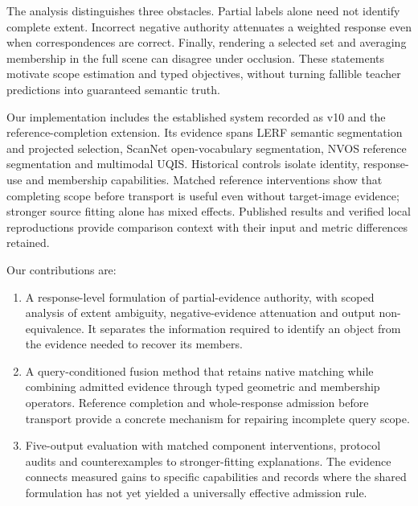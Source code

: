 The analysis distinguishes three obstacles. Partial labels alone need not
identify complete extent. Incorrect negative authority attenuates a weighted
response even when correspondences are correct. Finally, rendering a selected
set and averaging membership in the full scene can disagree under occlusion.
These statements motivate scope estimation and typed objectives, without
turning fallible teacher predictions into guaranteed semantic truth.

Our implementation includes the established system recorded as v10 and the
reference-completion extension. Its evidence spans LERF semantic segmentation
and projected selection, ScanNet open-vocabulary segmentation, NVOS reference
segmentation and multimodal UQIS. Historical controls isolate identity,
response-use and membership capabilities. Matched reference interventions show
that completing scope before transport is useful even without target-image
evidence; stronger source fitting alone has mixed effects. Published results
and verified local reproductions provide comparison context with their input
and metric differences retained.

Our contributions are:
\begin{enumerate}
\item A response-level formulation of partial-evidence authority, with scoped
analysis of extent ambiguity, negative-evidence attenuation and output
non-equivalence. It separates the information required to identify an object
from the evidence needed to recover its members.
\item A query-conditioned fusion method that retains native matching while
combining admitted evidence through typed geometric and membership operators.
Reference completion and whole-response admission before transport provide a
concrete mechanism for repairing incomplete query scope.
\item Five-output evaluation with matched component interventions, protocol
audits and counterexamples to stronger-fitting explanations. The evidence
connects measured gains to specific capabilities and records where the shared
formulation has not yet yielded a universally effective admission rule.
\end{enumerate}
